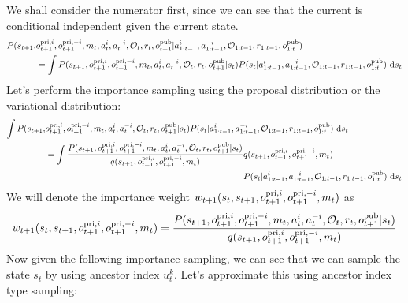 We shall consider the numerator first, since we can see that the current is conditional independent given the current state.
\begin{equation}
\begin{aligned}
    P(s_{t+1}, &o^{\operatorname{pri}, i}_{t+1}, o^{\operatorname{pri}, -i}_{t+1}, m_t, a^i_t, a^{-i}_t, \mathcal{O}_t, r_t , o^{\operatorname{pub}}_{t+1}| a^{i}_{1:t-1}, a^{-i}_{1:t-1}, \mathcal{O}_{1:t-1}, r_{1:t-1}, o^{\operatorname{pub}}_{1:t}) \\
    &= \int P(s_{t+1}, o^{\operatorname{pri}, i}_{t+1}, o^{\operatorname{pri}, -i}_{t+1}, m_t, a^i_t, a^{-i}_t, \mathcal{O}_t, r_t , o^{\operatorname{pub}}_{t+1} | s_t) 
    P(s_t | a^{i}_{1:t-1}, a^{-i}_{1:t-1}, \mathcal{O}_{1:t-1}, r_{1:t-1}, o^{\operatorname{pub}}_{1:t}) \ \mathrm{d} s_t
\end{aligned}
\end{equation}
Let's perform the importance sampling using the proposal distribution or the variational distribution:
\begin{equation}
\begin{aligned}
    \int P(s_{t+1}, &o^{\operatorname{pri}, i}_{t+1}, o^{\operatorname{pri}, -i}_{t+1}, m_t, a^i_t, a^{-i}_t, \mathcal{O}_t, r_t , o^{\operatorname{pub}}_{t+1} | s_t) 
    P(s_t | a^{i}_{1:t-1}, a^{-i}_{1:t-1}, \mathcal{O}_{1:t-1}, r_{1:t-1}, o^{\operatorname{pub}}_{1:t})\ \mathrm{d} s_t \\
    &= \begin{aligned}[t]
        \int \frac{P(s_{t+1}, o^{\operatorname{pri}, i}_{t+1}, o^{\operatorname{pri}, -i}_{t+1}, m_t, a^i_t, a^{-i}_t, \mathcal{O}_t, r_t , o^{\operatorname{pub}}_{t+1} | s_t)}{q(s_{t+1}, o^{\operatorname{pri}, i}_{t+1}, o^{\operatorname{pri}, -i}_{t+1}, m_t)} &q(s_{t+1}, o^{\operatorname{pri}, i}_{t+1}, o^{\operatorname{pri}, -i}_{t+1}, m_t) \\
        &P(s_t | a^{i}_{1:t-1}, a^{-i}_{1:t-1}, \mathcal{O}_{1:t-1}, r_{1:t-1}, o^{\operatorname{pub}}_{1:t}) \ \mathrm{d} s_t
    \end{aligned}
\end{aligned}
\end{equation}
We will denote the importance weight $w_{t+1}(s_t, s_{t+1}, o^{\operatorname{pri}, i}_{t+1}, o^{\operatorname{pri}, -i}_{t+1}, m_t)$ as 
\begin{equation}
    w_{t+1}(s_t, s_{t+1}, o^{\operatorname{pri}, i}_{t+1}, o^{\operatorname{pri}, -i}_{t+1}, m_t) = \frac{P(s_{t+1}, o^{\operatorname{pri}, i}_{t+1}, o^{\operatorname{pri}, -i}_{t+1}, m_t, a^i_t, a^{-i}_t, \mathcal{O}_t, r_t , o^{\operatorname{pub}}_{t+1} | s_t)}{q(s_{t+1}, o^{\operatorname{pri}, i}_{t+1}, o^{\operatorname{pri}, -i}_{t+1}, m_t)}
\end{equation}
Now given the following importance sampling, we can see that we can sample the state $s_t$ by using ancestor index $u^k_t$. Let's approximate this using ancestor index type sampling:
